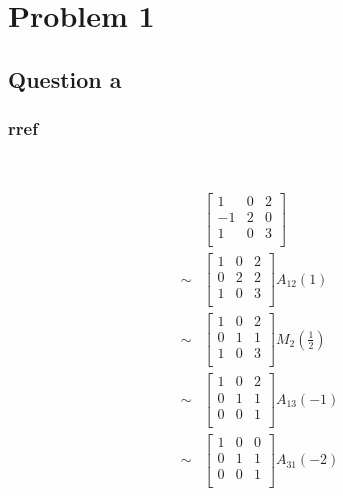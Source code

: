 \documentclass{article}
\begin{document}
\section{Problem 1}

\subsection{Question a}

\subsubsection{rref}

~

\begin{equation*}
    \begin{split}
        &\begin{bmatrix}
            1&0&2\\
            -1&2&0\\
            1&0&3\\
        \end{bmatrix}\\
        \sim&\begin{bmatrix}
            1&0&2\\
            0&2&2\\
            1&0&3\\
        \end{bmatrix}A_{12}(1)\\
        \sim&\begin{bmatrix}
            1&0&2\\
            0&1&1\\
            1&0&3\\
        \end{bmatrix}M_{2}(\frac{1}{2})\\
        \sim&\begin{bmatrix}
            1&0&2\\
            0&1&1\\
            0&0&1\\
        \end{bmatrix}A_{13}(-1)\\
        \sim&\begin{bmatrix}
            1&0&0\\
            0&1&1\\
            0&0&1\\
        \end{bmatrix}A_{31}(-2)\\

\end{split}
\end{equation*}
\end{document}
